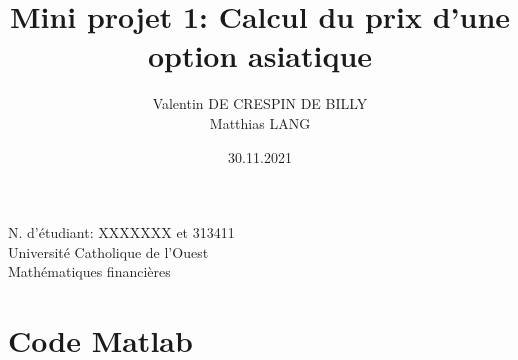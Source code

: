 \documentclass[a4paper,12pt]{scrartcl}
\title{Mini projet 1: Calcul du prix d'une option asiatique}
\author{Valentin DE CRESPIN DE BILLY \\ Matthias LANG}
\date{30.11.2021}
\begin{document}
\maketitle
\begin{center}

  \thispagestyle{empty}

  N. d'étudiant: XXXXXXX et 313411\\
  Université Catholique de l'Ouest\\
  Mathématiques financières\\
\end{center}

\newpage






\appendix
\appendixpage
\addappheadtotoc

\section{Code Matlab}

\end{document}
